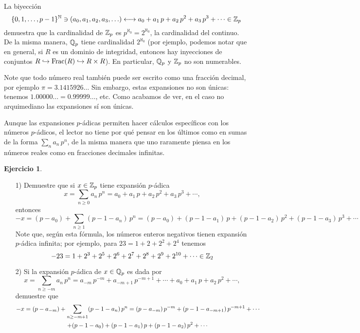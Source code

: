 \documentclass{article}
\numberwithin{equation}{section}
\theoremstyle{definition}
\newtheorem{ejerc}{Ejercicio}
\begin{document}
La biyección
\[ \{ 0,1,\ldots,p-1 \}^{\mathbb{N}} \ni (a_0,a_1,a_2,a_3,\ldots)
   \longleftrightarrow
   a_0 + a_1\,p + a_2\,p^2 + a_3\,p^3 + \cdots\in \mathbb{Z}_p \]
demuestra que la cardinalidad de $\mathbb{Z}_p$ es $p^{\aleph_0} = 2^{\aleph_0}$,
la cardinalidad del continuo. De la misma manera, $\mathbb{Q}_p$ tiene cardinalidad
$2^{\aleph_0}$ (por ejemplo, podemos notar que en general, si $R$ es un dominio
de integridad, entonces hay inyecciones de conjuntos
$R \hookrightarrow \operatorname{Frac} (R) \hookrightarrow R\times R$). En particular, $\mathbb{Q}_p$
y $\mathbb{Z}_p$ no son numerables.

Note que todo número real también puede ser escrito como una fracción decimal,
por ejemplo $\pi = 3.1415926\ldots$ Sin embargo, estas expansiones
no son únicas: tenemos $1.00000\ldots = 0.99999\ldots$, etc. Como acabamos
de ver, en el caso no arquimediano las expansiones sí son únicas.

\begin{advertencia}
  Aunque las expansiones $p$-ádicas permiten hacer cálculos específicos con
  los números $p$-ádicos, el lector no tiene por qué pensar en los últimos como
  en sumas de la forma $\sum_n a_n\,p^n$, de la misma manera que uno raramente
  piensa en los números reales como en fracciones decimales infinitas.
\end{advertencia}

\begin{ejerc}
  ~

  \begin{enumerate}
  \item[1)] Demuestre que si $x\in \mathbb{Z}_p$ tiene expansión $p$-ádica
    \[ x = \sum_{n\ge 0} a_n\,p^n
         = a_0 + a_1\,p + a_2\,p^2 + a_3\,p^3 + \cdots, \]
    entonces
    \[ -x = (p-a_0) + \sum_{n\ge 1} (p-1-a_n)\,p^n
          = (p-a_0) + (p-1-a_1)\,p + (p-1-a_2)\,p^2 + (p-1-a_3)\,p^3 + \cdots \]
    Note que, según esta fórmula, los números enteros negativos tienen expansión
    $p$-ádica infinita; por ejemplo, para $23 = 1 + 2 + 2^2 + 2^4$ tenemos
    $$-23 = 1 + 2^3 + 2^5 + 2^6 + 2^7 + 2^8 + 2^9 + 2^{10} + \cdots \in \mathbb{Z}_2$$

  \item[2)] Si la expansión $p$-ádica de $x\in \mathbb{Q}_p$ es dada por
    \[ x = \sum_{n \ge -m} a_n\,p^n
         = a_{-m}\,p^{-m} + a_{-m+1}\,p^{-m+1} + \cdots
               + a_0 + a_1\,p + a_2\,p^2 + \cdots, \]
    demuestre que
    \begin{multline*}
      -x = (p-a_{-m}) + \sum_{n \ge -m+1} (p-1-a_n)\,p^n =
      (p-a_{-m})\,p^{-m} + (p-1-a_{-m+1})\,p^{-m+1} + \cdots\\
      + (p-1-a_0) + (p-1-a_1)\,p + (p-1-a_2)\,p^2 + \cdots$$
    \end{multline*}
  \end{enumerate}
\end{ejerc}
\end{document}
